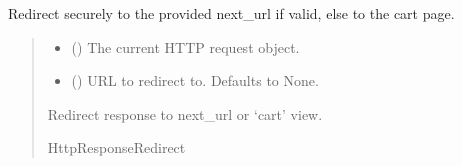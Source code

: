 \documentclass[letterpaper,10pt,english]{sphinxmanual}
\begin{document}
\begin{fulllineitems}
\label{\detokenize{cart:cart.views.redirect_secure}}
\pysigstartsignatures
\pysiglinewithargsret
{}
{\sphinxparamcomma {}}
{}
\pysigstopsignatures
\sphinxAtStartPar
Redirect securely to the provided next\_url if valid, else to the cart page.
\begin{quote}\begin{description}
\begin{itemize}
\item {} 
\sphinxAtStartPar
{} () \textendash{} The current HTTP request object.

\item {} 
\sphinxAtStartPar
{} (\sphinxstyleliteralemphasis{\sphinxupquote{, }}) \textendash{} URL to redirect to. Defaults to None.

\end{itemize}

\sphinxAtStartPar
Redirect response to next\_url or ‘cart’ view.

\sphinxAtStartPar
HttpResponseRedirect

\end{description}\end{quote}

\end{fulllineitems}

\end{document}
